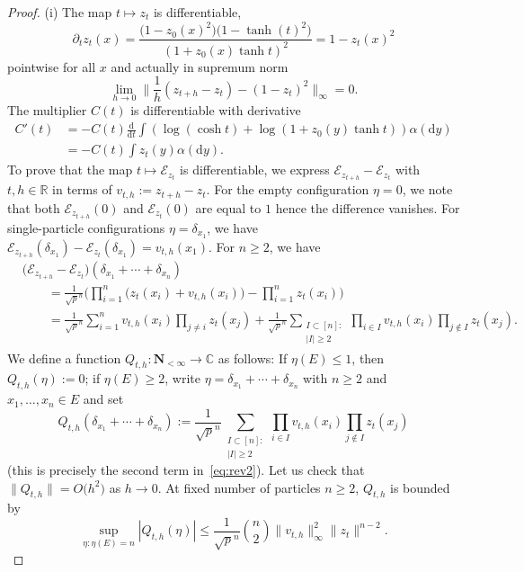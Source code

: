\documentclass[10pt,a4paper]{amsart}
\numberwithin{equation}{section}
\newcommand{\R}{\mathbb{R}}
\newcommand{\C}{\mathbb{C}}
\newcommand{\dd}{\mathrm{d}} %
\newcommand{\1}{\mathbbm{1}}
\begin{document}
\begin{proof}
(i) The map $t\mapsto z_t$ is differentiable,
\[
	\partial_t z_t(x) = \frac{\bigl(1-z_0(x)^2\bigr) \bigl(1- \tanh(t)^2\bigr)}{(1+z_0(x)\tanh t)^2} = 1- z_t(x)^2
\]
pointwise for all $x$ and actually in supremum norm
\[
	\lim_{h\to 0} \biggl\| \frac{1}{h} (z_{t+h} - z_t) - (1- z_t)^2 \biggr\|_\infty =0.
\]
The multiplier $C(t)$ is differentiable with derivative
\begin{align}
	C'(t) &= - C(t) \frac{\dd}{\dd t}\int ( \log (\cosh t) + \log (1+z_0(y)\tanh t)) \alpha (\dd y) \nonumber\\
	 &= - C(t) \int z_t(y) \alpha(\dd y).\label{eq:ctdiff}
\end{align}
To prove that the map $t\mapsto \mathcal E_{z_t}$ is differentiable, we express $\mathcal E_{z_{t+h}} - \mathcal E_{z_t}$ with $t,h\in \R$ in terms of $v_{t,h}:= z_{t+h} - z_t$. For the empty configuration $\eta=0$, we note that both $\mathcal E_{z_{t+h}}(0)$ and $\mathcal E_{z_t}(0)$ are equal to $1$ hence the difference vanishes. For single-particle configurations $\eta=\delta_{x_1}$, we have $\mathcal E_{z_{t+h}} (\delta_{x_1}) - \mathcal E_{z_{t}} (\delta_{x_1}) = v_{t,h}(x_1)$.
For $n\geq 2$, we have
\begin{align}
	&\bigl(\mathcal E_{z_{t+h}} - \mathcal E_{z_t}\bigr) (\delta_{x_1}+\cdots+\delta_{x_n}) \nonumber\\
	&	\qquad {} = \frac{1}{{\sqrt p}^n} \Biggl( \prod_{i=1}^n \bigl(z_t(x_i)+ v_{t,h}(x_i)\bigr) - \prod_{i=1}^n z_t(x_i)\Biggr) \nonumber \\
	& \qquad {} = \frac{1}{{\sqrt p}^n} \sum_{i=1}^n v_{t,h}(x_i) \prod_{j \neq i} z_t(x_j) + \frac{1}{{\sqrt p}^n} \sum_{\substack{I\subset [n]:\\ |I|\geq 2}} \prod_{i\in I} v_{t,h}(x_i) \prod_{j\notin I} z_t(x_j). \label{eq:rev2}
\end{align}
We define a function $Q_{t,h}\colon \mathbf N_{<\infty}\to \C$ as follows: If $\eta(E)\leq 1$, then $Q_{t,h}(\eta):=0$; if $\eta(E) \geq 2$, write $\eta = \delta_{x_1}+\cdots+\delta_{x_n}$ with $n\geq 2$ and $x_1,\ldots,x_n\in E$ and set
\[
	Q_{t,h}(\delta_{x_1}+\cdots + \delta_{x_n}) := \frac{1}{{\sqrt p}^n} \sum_{\substack{I\subset [n]:\\ |I|\geq 2}} \prod_{i\in I} v_{t,h}(x_i) \prod_{j\notin I} z_t(x_j)
\]
(this is precisely the second term in~\eqref{eq:rev2}). Let us check that $\|Q_{t,h}\| = O\bigl(h^2\bigr)$ as $h\to 0$. At fixed number of particles $n\geq 2$, $Q_{t,h}$ is bounded by
\[
	\sup_{\eta\colon   \eta(E) = n} |Q_{t,h}(\eta)| \leq \frac{1}{{\sqrt p}^{n}} \binom{n}{2} \|v_{t,h}\|_\infty^2 \|z_t\|^{n-2}.
\]
\end{proof}
\end{document}
